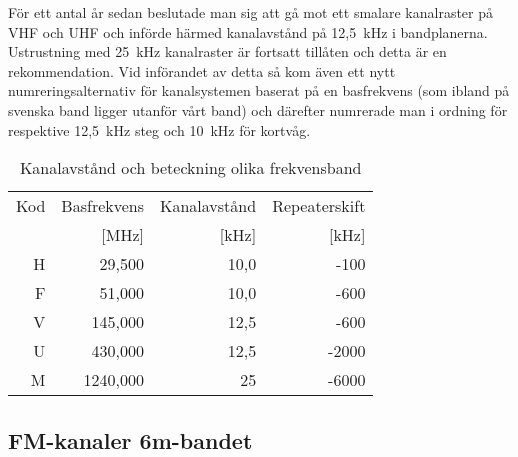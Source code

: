 För ett antal år sedan beslutade man sig att gå mot ett smalare kanalraster på
VHF och UHF och införde härmed kanalavstånd på 12,5~kHz i bandplanerna.
Ustrustning med 25~kHz kanalraster är fortsatt tillåten och detta är en
rekommendation. Vid införandet av detta så kom även ett nytt
numreringsalternativ för kanalsystemen baserat på en basfrekvens (som ibland
på svenska band ligger utanför vårt band) och därefter numrerade man i ordning
för respektive 12,5~kHz steg och 10~kHz för kortvåg.

\begin{table}[h]
\centering
\begin{tabular}{rrrr}
Kod & Basfrekvens & Kanalavstånd & Repeaterskift \\
    & [MHz]       & [kHz]        & [kHz] \\ \hline
H & 29,500 & 10,0 & -100 \\
F & 51,000 & 10,0 & -600 \\
V & 145,000& 12,5 & -600 \\
U & 430,000& 12,5 & -2000 \\
M & 1240,000 & 25 & -6000 \\
\end{tabular}
\label{tab:kanalavstand}
\caption{Kanalavstånd och beteckning olika frekvensband}
\end{table}

\subsection{FM-kanaler 6m-bandet}

